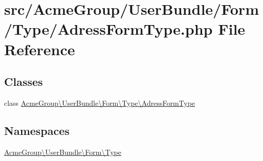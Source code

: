 \hypertarget{_adress_form_type_8php}{\section{src/\+Acme\+Group/\+User\+Bundle/\+Form/\+Type/\+Adress\+Form\+Type.php File Reference}
\label{_adress_form_type_8php}
}
\subsection*{Classes}
\begin{DoxyCompactItemize}
\item 
class \hyperlink{class_acme_group_1_1_user_bundle_1_1_form_1_1_type_1_1_adress_form_type}{Acme\+Group\textbackslash{}\+User\+Bundle\textbackslash{}\+Form\textbackslash{}\+Type\textbackslash{}\+Adress\+Form\+Type}
\end{DoxyCompactItemize}
\subsection*{Namespaces}
\begin{DoxyCompactItemize}
\item 
 \hyperlink{namespace_acme_group_1_1_user_bundle_1_1_form_1_1_type}{Acme\+Group\textbackslash{}\+User\+Bundle\textbackslash{}\+Form\textbackslash{}\+Type}
\end{DoxyCompactItemize}
